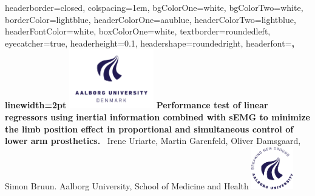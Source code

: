 \documentclass[landscape,a0paper,fontscale=0.37]{baposter} %
\begin{document}
\begin{poster}
{
headerborder=closed, %
colspacing=1em, %
bgColorOne=white, %
bgColorTwo=white, %
borderColor=lightblue, %
headerColorOne=aaublue, %
headerColorTwo=lightblue, %
headerFontColor=white, %
boxColorOne=white, %
textborder=roundedleft, %
eyecatcher=true, %
headerheight=0.1\textheight, %
headershape=roundedright, %
headerfont=\Large\bf\textsc, %
linewidth=2pt %
}
%
{\includegraphics[height=7em]{AAU_LOGO_RGB_UK.png}} %
{\bf Performance test of linear regressors using inertial information combined with sEMG to minimize the limb position effect in proportional and simultaneous control of lower arm prosthetics. \vspace{0.05em}} %
{\ Irene Uriarte, Martin Garenfeld, Oliver Damsgaard, Simon Bruun. \hspace{5pt} Aalborg University, School of Medicine and Health} %
{\includegraphics[height=5em]{AAU_UK_CIRCLE_blue_rgb.png}} %


\end{poster}
\end{document}
